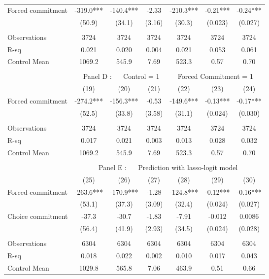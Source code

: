 \begin{tabular}{lcccccc}
\midrule
\midrule
Forced commitment  & -319.0*** & -140.4*** & -2.33 & -210.3*** & -0.21*** & -0.24*** \\
      & (50.9) & (34.1) & (3.16) & (30.3) & (0.023) & (0.027) \\
      &       &       &       &       &       &  \\
\midrule
Observations & 3724  & 3724  & 3724  & 3724  & 3724  & 3724 \\
R-sq  & 0.021 & 0.020 & 0.004 & 0.021 & 0.053 & 0.061 \\
Control Mean & 1069.2 & 545.9 & 7.69  & 523.3 & 0.57  & 0.70 \\
\midrule
\midrule
      &       &       &       &       &       &  \\
\midrule
      & \multicolumn{6}{c}{Panel D : $\quad$ Control  = 1       $\quad\quad$                      Forced Commitment = 1} \\
\midrule
\midrule
      & (19)  & (20)  & (21)  & (22)  & (23)  & (24) \\
\midrule
\midrule
Forced commitment  & -274.2*** & -156.3*** & -0.53 & -149.6*** & -0.13*** & -0.17*** \\
      & (52.5) & (33.8) & (3.58) & (31.1) & (0.024) & (0.030) \\
      &       &       &       &       &       &  \\
\midrule
Observations & 3724  & 3724  & 3724  & 3724  & 3724  & 3724 \\
R-sq  & 0.017 & 0.021 & 0.003 & 0.013 & 0.028 & 0.032 \\
Control Mean & 1069.2 & 545.9 & 7.69  & 523.3 & 0.57  & 0.70 \\
\midrule
\midrule
      &       &       &       &       &       &  \\
\midrule
      & \multicolumn{6}{c}{Panel E : $\quad$ Prediction with lasso-logit model} \\
\midrule
\midrule
      & (25)  & (26)  & (27)  & (28)  & (29)  & (30) \\
\midrule
\midrule
Forced commitment  & -263.6*** & -170.9*** & -1.28 & -124.8*** & -0.12*** & -0.16*** \\
      & (53.1) & (37.3) & (3.09) & (32.4) & (0.024) & (0.027) \\
Choice commitment & -37.3 & -30.7 & -1.83 & -7.91 & -0.012 & 0.0086 \\
      & (56.4) & (41.9) & (2.93) & (34.5) & (0.024) & (0.028) \\
      &       &       &       &       &       &  \\
\midrule
Observations & 6304  & 6304  & 6304  & 6304  & 6304  & 6304 \\
R-sq  & 0.018 & 0.022 & 0.002 & 0.010 & 0.017 & 0.043 \\
Control Mean & 1029.8 & 565.8 & 7.06  & 463.9 & 0.51  & 0.66 \\
\bottomrule
\bottomrule
\end{tabular}%
